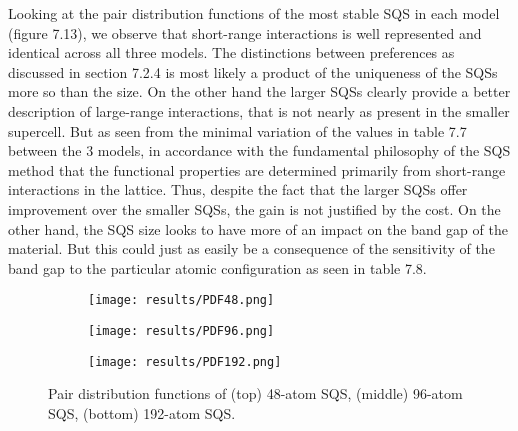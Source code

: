 Looking at the pair distribution functions of the most stable SQS in each model (figure 7.13), we observe that short-range interactions is well represented and identical across all three models. The distinctions between preferences as discussed in section 7.2.4 is most likely a product of the uniqueness of the SQSs more so than the size. On the other hand the larger SQSs clearly provide a better description of large-range interactions, that is not nearly as present in the smaller supercell. But as seen from the minimal variation of the values in table 7.7 between the 3 models, in accordance with the fundamental philosophy of the SQS method that the functional properties are determined primarily from short-range interactions in the lattice. Thus, despite the fact that the larger SQSs offer improvement over the smaller SQSs, the gain is not justified by the cost. On the other hand, the SQS size looks to have more of an impact on the band gap of the material. But this could just as easily be a consequence of the sensitivity of the band gap to the particular atomic configuration as seen in table 7.8.

\begin{figure}[H]
\begin{subfigure}{\textwidth}
\texttt{[image: results/PDF48.png]}
\end{subfigure}
\begin{subfigure}{\textwidth}
\texttt{[image: results/PDF96.png]}
\end{subfigure}
\begin{subfigure}{\textwidth}
\texttt{[image: results/PDF192.png]}
\end{subfigure}
\caption{Pair distribution functions of  (top) 48-atom SQS, (middle) 96-atom SQS, (bottom) 192-atom SQS.}
\end{figure}
